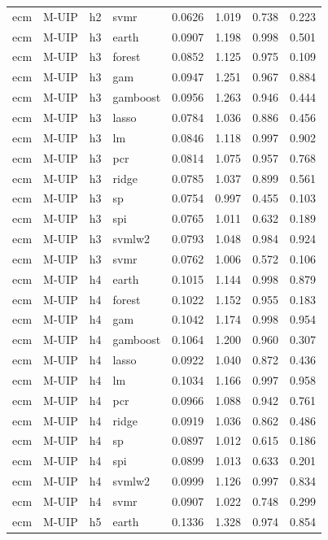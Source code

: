 \begin{ThreePartTable}
\begin{longtable}[t]{llclcccc}
ecm & M-UIP & h2 & svmr & 0.0626 & 1.019 & 0.738 & 0.223\\
\addlinespace
ecm & M-UIP & h3 & earth & 0.0907 & 1.198 & 0.998 & 0.501\\
ecm & M-UIP & h3 & forest & 0.0852 & 1.125 & 0.975 & 0.109\\
ecm & M-UIP & h3 & gam & 0.0947 & 1.251 & 0.967 & 0.884\\
ecm & M-UIP & h3 & gamboost & 0.0956 & 1.263 & 0.946 & 0.444\\
ecm & M-UIP & h3 & lasso & 0.0784 & 1.036 & 0.886 & 0.456\\
ecm & M-UIP & h3 & lm & 0.0846 & 1.118 & 0.997 & 0.902\\
ecm & M-UIP & h3 & pcr & 0.0814 & 1.075 & 0.957 & 0.768\\
ecm & M-UIP & h3 & ridge & 0.0785 & 1.037 & 0.899 & 0.561\\
ecm & M-UIP & h3 & sp & 0.0754 & 0.997 & 0.455 & 0.103\\
ecm & M-UIP & h3 & spi & 0.0765 & 1.011 & 0.632 & 0.189\\
ecm & M-UIP & h3 & svmlw2 & 0.0793 & 1.048 & 0.984 & 0.924\\
ecm & M-UIP & h3 & svmr & 0.0762 & 1.006 & 0.572 & 0.106\\
\addlinespace
ecm & M-UIP & h4 & earth & 0.1015 & 1.144 & 0.998 & 0.879\\
ecm & M-UIP & h4 & forest & 0.1022 & 1.152 & 0.955 & 0.183\\
ecm & M-UIP & h4 & gam & 0.1042 & 1.174 & 0.998 & 0.954\\
ecm & M-UIP & h4 & gamboost & 0.1064 & 1.200 & 0.960 & 0.307\\
ecm & M-UIP & h4 & lasso & 0.0922 & 1.040 & 0.872 & 0.436\\
ecm & M-UIP & h4 & lm & 0.1034 & 1.166 & 0.997 & 0.958\\
ecm & M-UIP & h4 & pcr & 0.0966 & 1.088 & 0.942 & 0.761\\
ecm & M-UIP & h4 & ridge & 0.0919 & 1.036 & 0.862 & 0.486\\
ecm & M-UIP & h4 & sp & 0.0897 & 1.012 & 0.615 & 0.186\\
ecm & M-UIP & h4 & spi & 0.0899 & 1.013 & 0.633 & 0.201\\
ecm & M-UIP & h4 & svmlw2 & 0.0999 & 1.126 & 0.997 & 0.834\\
ecm & M-UIP & h4 & svmr & 0.0907 & 1.022 & 0.748 & 0.299\\
\addlinespace
ecm & M-UIP & h5 & earth & 0.1336 & 1.328 & 0.974 & 0.854\\

\end{longtable}
\end{ThreePartTable}
